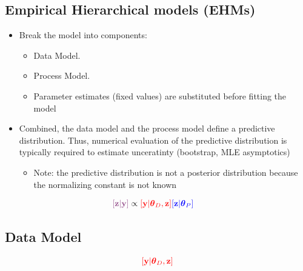 \documentclass[]{book}
\providecommand{\tightlist}{%
  \setlength{\itemsep}{0pt}\setlength{\parskip}{0pt}}
\begin{document}
\hypertarget{empirical-hierarchical-models-ehms}{%
\subsection{Empirical Hierarchical models (EHMs)}\label{empirical-hierarchical-models-ehms}}

\begin{itemize}
\item
  Break the model into components:

  \begin{itemize}
  \item
    { Data Model. }
  \item
    { Process Model. }
  \item
    { Parameter estimates } (fixed values) are substituted before fitting the model
  \end{itemize}
\item
  Combined, the { data model and } the { process model } define a { predictive distribution. } Thus, numerical evaluation of the { predictive distribution } is typically required to estimate unceratinty (bootstrap, MLE asymptotics)

  \begin{itemize}
  \tightlist
  \item
    Note: the predictive distribution is not a {posterior distribution} because the normalizing constant is not known
  \end{itemize}
\end{itemize}

\begin{align*}
\color{plum}{[\mathbf{z} | \mathbf{y}]} & \propto
\color{red}{[\mathbf{y} | \boldsymbol{\theta}_D, \mathbf{z}]}  \color{blue}{[\mathbf{z} | \boldsymbol{\theta}_P]}
\end{align*}

\hypertarget{data-model}{%
\subsection{Data Model}\label{data-model}}

\begin{align*}
\color{red}{[\mathbf{y} | \boldsymbol{\theta}_D, \mathbf{z}]}
\end{align*}
\end{document}
